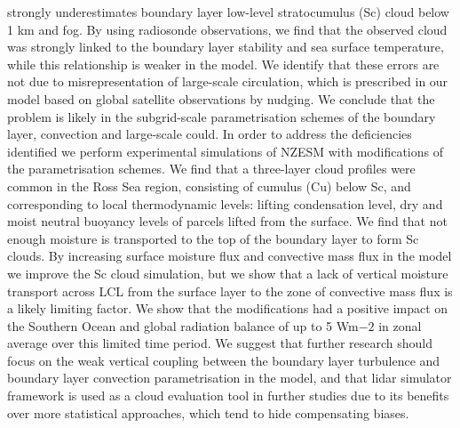 strongly underestimates boundary layer low-level stratocumulus (Sc) cloud below
1 km and fog. By using radiosonde observations, we find that the observed cloud was strongly linked to the boundary layer stability and sea surface temperature, while this relationship is weaker in the
model. We identify that these errors are not due to misrepresentation of
large-scale circulation, which is prescribed in our model based on global
satellite observations by nudging. We conclude that the problem is likely in
the subgrid-scale parametrisation schemes of the boundary layer, convection
and large-scale could. In order to address the deficiencies identified we
perform experimental simulations of NZESM with modifications of the
parametrisation schemes. We find that a three-layer cloud profiles were common
in the Ross Sea region, consisting of cumulus (Cu) below Sc, and
corresponding to local thermodynamic levels: lifting condensation level,
dry and moist neutral buoyancy levels of parcels lifted from the surface.
We find that not enough moisture is transported to the top of the boundary
layer to form Sc clouds. By increasing surface moisture flux and convective mass flux in the model we improve the Sc cloud simulation, but we show that a lack of vertical moisture transport across LCL from the surface layer to the zone of convective mass flux is a likely limiting factor. We show that the modifications had a positive impact on the Southern Ocean and global radiation balance of up to 5 Wm${-2}$ in zonal average over this limited time period. We suggest that
further research should focus on the weak vertical coupling between the boundary
layer turbulence and boundary layer convection parametrisation in the model, and that
lidar simulator framework is used as a cloud evaluation tool in further studies
due to its benefits over more statistical approaches, which tend to hide
compensating biases. 
